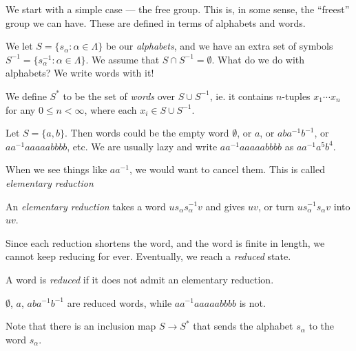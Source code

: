 \documentclass[a4paper]{article}
\begin{document}
We start with a simple case --- the free group. This is, in some sense, the ``freest'' group we can have. These are defined in terms of alphabets and words.

\begin{defi}
 We let $S = \{s_\alpha: \alpha \in \Lambda\}$ be our \emph{alphabets}, and we have an extra set of symbols $S^{-1} = \{s_\alpha^{-1}: \alpha \in \Lambda\}$. We assume that $S\cap S^{-1} = \emptyset$. What do we do with alphabets? We write words with it!

 We define $S^*$ to be the set of \emph{words} over $S\cup S^{-1}$, ie. it contains $n$-tuples $x_1 \cdots x_n$ for any $0 \leq n < \infty$, where each $x_i \in S \cup S^{-1}$.
\end{defi}

\begin{eg}
  Let $S = \{a, b\}$. Then words could be the empty word $\emptyset$, or $a$, or $aba^{-1}b^{-1}$, or $aa^{-1}aaaaabbbb$, etc. We are usually lazy and write $aa^{-1}aaaaabbbb$ as $aa^{-1}a^5 b^4$.
\end{eg}

When we see things like $aa^{-1}$, we would want to cancel them. This is called \emph{elementary reduction}
\begin{defi}
  An \emph{elementary reduction} takes a word $us_\alpha s_\alpha^{-1}v$ and gives $uv$, or turn $us_\alpha^{-1}s_\alpha v$ into $uv$.
\end{defi}
Since each reduction shortens the word, and the word is finite in length, we cannot keep reducing for ever. Eventually, we reach a \emph{reduced} state.

\begin{defi}
  A word is \emph{reduced} if it does not admit an elementary reduction.
\end{defi}

\begin{eg}
  $\emptyset$, $a$, $aba^{-1}b^{-1}$ are reduced words, while $aa^{-1}aaaaabbbb$ is not.
\end{eg}
Note that there is an inclusion map $S \to S^*$ that sends the alphabet $s_\alpha$ to the word $s_\alpha$.
\end{document}
